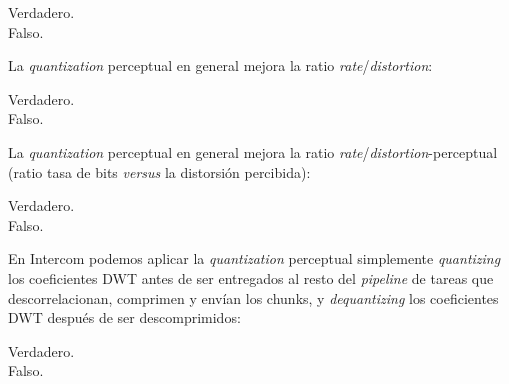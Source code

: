 \documentclass[legalpaper, 12pt, addpoints]{exam}
\begin{document}
\begin{questions}
\begin{oneparchoices}
  \choice Verdadero.\\
  \choice Falso.
\end{oneparchoices}
  
\vspace{0.10in}

\question La \emph{quantization} perceptual en general mejora la ratio
\emph{rate}/\emph{distortion}:

\begin{oneparchoices}
  \choice Verdadero.\\
  \choice Falso.
\end{oneparchoices}
  
\vspace{0.10in}

\question La \emph{quantization} perceptual en general mejora la ratio
\emph{rate}/\emph{distortion}-perceptual (ratio tasa de bits
\emph{versus} la distorsión percibida):

\begin{oneparchoices}
  \choice Verdadero.\\
  \choice Falso.
\end{oneparchoices}

\vspace{0.10in}

\question En Intercom podemos aplicar la \emph{quantization}
perceptual simplemente \emph{quantizing} los coeficientes DWT antes de
ser entregados al resto del \emph{pipeline} de tareas que
descorrelacionan, comprimen y envían los chunks, y \emph{dequantizing}
los coeficientes DWT después de ser descomprimidos:

\begin{oneparchoices}
  \choice Verdadero.\\
  \choice Falso.
\end{oneparchoices}

\vspace{0.10in}

\vspace{0.25in} {}

\end{questions}
\end{document}
